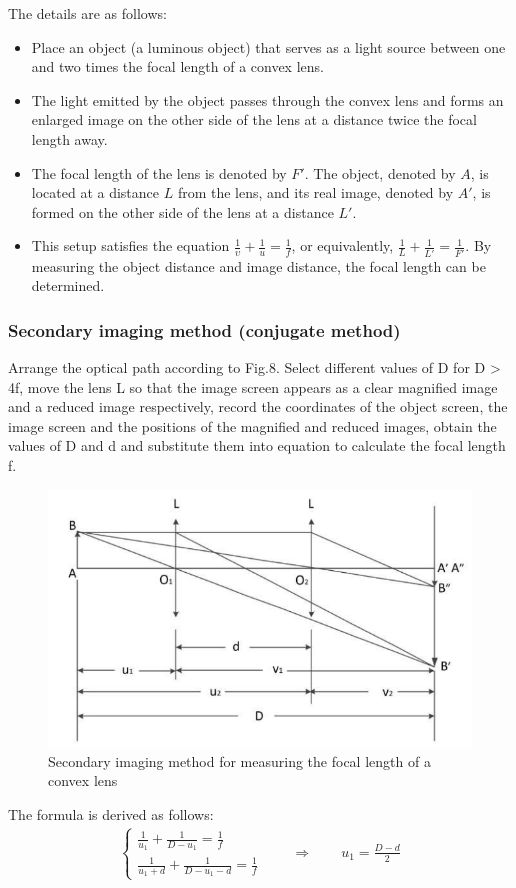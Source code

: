 \documentclass[UTF8]{article}
\begin{document}
	The details are as follows:
	\begin{itemize}
	\item Place an object (a luminous object) that serves as a light source between one and two times the focal length of a convex lens.
	\item The light emitted by the object passes through the convex lens and forms an enlarged image on the other side of the lens at a distance twice the focal length away.
	\item The focal length of the lens is denoted by $F'$. The object, denoted by $A$, is located at a distance $L$ from the lens, and its real image, denoted by $A'$, is formed on the other side of the lens at a distance $L'$.
	\item This setup satisfies the equation $\frac{1}{\upsilon } +\frac{1}{u}  =  \frac{1}{f}$, or equivalently, $\frac{1}{L} +\frac{1}{L'}  =  \frac{1}{F'}$. By measuring the object distance and image distance, the focal length can be determined.
	\end{itemize}
	
	\subsubsection{Secondary imaging method (conjugate method)}
	Arrange the optical path according to Fig.8. Select different values of D for D > 4f, move the lens L so that the image screen appears as a clear magnified image and a reduced image respectively, record the coordinates of the object screen, the image screen and the positions of the magnified and reduced images, obtain the values of D and d and substitute them into equation  to calculate the focal length f.
	\begin{figure}[H]
	     	\centering
	     	\includegraphics[clip,scale=1,trim={0 0 0 0}]{fig/fig8.png}
	     	\caption{Secondary imaging method for measuring the focal length of a convex lens}
	     	\label{figure.8}
	\end{figure}
	The formula is derived as follows:
	\begin{eqnarray}
	\begin{cases}
	 \frac{1}{u_1}+\frac{1}{D-u_1}  =  \frac{1}{f}   \\
	\frac{1}{u_{1}+d}+\frac{1}{D-u_{1}-d}  =  \frac{1}{f}   
	\end{cases}
	\qquad \Rightarrow \qquad u_1  = \frac{D-d}{2} 
	\end{eqnarray}
	
\end{document}
